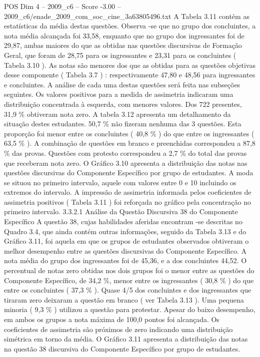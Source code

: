 \begin{textsample}{POS Dim 4 – 2009\_c6 – Score -3.00 – 2009\_c6/enade\_2009\_com\_soc\_cine\_3a63805496.txt}
A Tabela 3.11 contém as estatísticas da média destas questões.
Observa -se que no grupo dos concluintes, a nota média alcançada foi 33,58, enquanto que no grupo dos ingressantes foi de 29,87, ambas maiores do que as obtidas nas questões discursivas de Formação Geral, que foram de 28,75 para os ingressantes e 23,31 para os concluintes ( Tabela 3.10 ).
As notas são menores dos que as obtidas para as questões objetivas desse componente ( Tabela 3.7 ) : respectivamente 47,80 e 48,56 para ingressantes e concluintes.
A análise de cada uma destas questões será feita nas subseções seguintes.
Os valores positivos para a medida de assimetria indicaram uma distribuição concentrada à esquerda, com menores valores.
Dos 722 presentes, 31,9 \% obtiveram nota zero.
A tabela 3.12 apresenta um detalhamento da situação destes estudantes. 50,7 \% não fizeram nenhuma das 3 questões.
Esta proporção foi menor entre os concluintes ( 40,8 \% ) do que entre os ingressantes ( 63,5 \% ).
A combinação de questões em branco e preenchidas correspondeu a 87,8 \% das provas.
Questões com protesto correspondeu a 2,7 \% do total das provas que receberam nota zero.
O Gráfico 3.10 apresenta a distribuição das notas nas questões discursivas do Componente Específico por grupo de estudantes.
A moda se situou no primeiro intervalo, aquele com valores entre 0 e 10 incluindo os extremos do intervalo.
A impressão de assimetria informada pelos coeficientes de assimetria positivos ( Tabela 3.11 ) foi reforçada no gráfico pela concentração no primeiro intervalo. 3.3.2.1 Análise da Questão Discursiva 38 do Componente Específico A questão 38, cujas habilidades aferidas encontram -se descritas no Quadro 3.4, que ainda contém outras informações, seguido da Tabela 3.13 e do Gráfico 3.11, foi aquela em que os grupos de estudantes observados obtiveram o melhor desempenho entre as questões discursivas do Componente Específico.
A nota média do grupo dos ingressantes foi de 45,36, e a dos concluintes 44,52.
O percentual de notas zero obtidas nos dois grupos foi o menor entre as questões do Componente Específico, de 34,2 \%, menor entre os ingressantes ( 30,8 \% ) do que entre os concluintes ( 37,3 \% ).
Quase 4/5 dos concluintes e dos ingressantes que tiraram zero deixaram a questão em branco ( ver Tabela 3.13 ).
Uma pequena minoria ( 9,3 \% ) utilizou a questão para protestar.
Apesar do baixo desempenho, em ambos os grupos a nota máxima de 100,0 pontos foi alcançada.
Os coeficientes de assimetria são próximos de zero indicando uma distribuição simétrica em torno da média.
O Gráfico 3.11 apresenta a distribuição das notas na questão 38 discursiva do Componente Específico por grupo de estudantes.

\end{textsample}
